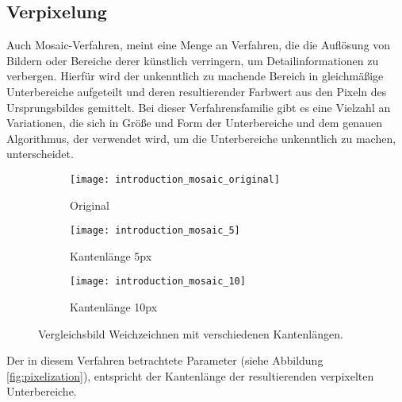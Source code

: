 \subsection{Verpixelung}
Auch Mosaic-Verfahren, meint eine Menge an Verfahren, die die Auflösung von Bildern oder Bereiche derer künstlich
verringern, um Detailinformationen zu verbergen. Hierfür wird der unkenntlich zu machende Bereich in gleichmäßige
Unterbereiche aufgeteilt und deren resultierender Farbwert aus den Pixeln des Ursprungsbildes gemittelt. Bei dieser
Verfahrensfamilie gibt es eine Vielzahl an Variationen, die sich in Größe und Form der Unterbereiche und dem genauen
Algorithmus, der verwendet wird, um die Unterbereiche unkenntlich zu machen, unterscheidet.

\begin{figure}[H]
    \centering
    \begin{subfigure}{0.3\textwidth}
        \texttt{[image: introduction\_mosaic\_original]}
        \caption{\small Original}
    \end{subfigure}
    \begin{subfigure}{0.3\textwidth}
        \texttt{[image: introduction\_mosaic\_5]}
        \caption{\small Kantenlänge 5px}
    \end{subfigure}
    \begin{subfigure}{0.3\textwidth}
        \texttt{[image: introduction\_mosaic\_10]}
        \caption{\small Kantenlänge 10px}
    \end{subfigure}

    \caption{Vergleichsbild Weichzeichnen mit verschiedenen Kantenlängen.}
    \label{fig:pixelization}
\end{figure}

Der in diesem Verfahren betrachtete Parameter (siehe Abbildung \space \vref*{fig:pixelization}), entspricht der Kantenlänge der
resultierenden verpixelten Unterbereiche.
